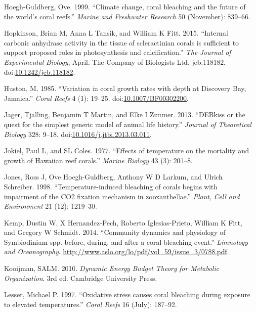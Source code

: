 \documentclass[]{elsarticle} %
\begin{document}
\hypertarget{ref-HoeghGuldberg:1999p4222}{}
Hoegh-Guldberg, Ove. 1999. ``Climate change, coral bleaching and the
future of the world's coral reefs.'' \emph{Marine and Freshwater
Research} 50 (November): 839--66.

\hypertarget{ref-Hopkinson:2015ev}{}
Hopkinson, Brian M, Anna L Tansik, and William K Fitt. 2015. ``Internal
carbonic anhydrase activity in the tissue of scleractinian corals is
sufficient to support proposed roles in photosynthesis and
calcification.'' \emph{The Journal of Experimental Biology}, April. The
Company of Biologists Ltd, jeb.118182.
doi:\href{https://doi.org/10.1242/jeb.118182}{10.1242/jeb.118182}.

\hypertarget{ref-Huston:1985ec}{}
Huston, M. 1985. ``Variation in coral growth rates with depth at
Discovery Bay, Jamaica.'' \emph{Coral Reefs} 4 (1): 19--25.
doi:\href{https://doi.org/10.1007/BF00302200}{10.1007/BF00302200}.

\hypertarget{ref-Jager:2013bj}{}
Jager, Tjalling, Benjamin T Martin, and Elke I Zimmer. 2013. ``DEBkiss
or the quest for the simplest generic model of animal life history.''
\emph{Journal of Theoretical Biology} 328: 9--18.
doi:\href{https://doi.org/10.1016/j.jtbi.2013.03.011}{10.1016/j.jtbi.2013.03.011}.

\hypertarget{ref-Jokiel:1977p7353}{}
Jokiel, Paul L, and SL Coles. 1977. ``Effects of temperature on the
mortality and growth of Hawaiian reef corals.'' \emph{Marine Biology} 43
(3): 201--8.

\hypertarget{ref-Jones:1998p3572}{}
Jones, Ross J, Ove Hoegh-Guldberg, Anthony W D Larkum, and Ulrich
Schreiber. 1998. ``Temperature-induced bleaching of corals begins with
impairment of the CO2 fixation mechanism in zooxanthellae.''
\emph{Plant, Cell and Environment} 21 (12): 1219--30.

\hypertarget{ref-Kemp:2014ug}{}
Kemp, Dustin W, X Hernandez-Pech, Roberto Iglesias-Prieto, William K
Fitt, and Gregory W Schmidt. 2014. ``Community dynamics and physiology
of Symbiodinium spp. before, during, and after a coral bleaching
event.'' \emph{Limnology and Oceanography}.
\url{http://www.aslo.org/lo/pdf/vol_59/issue_3/0788.pdf}.

\hypertarget{ref-Kooijman:2010vd}{}
Kooijman, SALM. 2010. \emph{Dynamic Energy Budget Theory for Metabolic
Organization}. 3rd ed. Cambridge University Press.

\hypertarget{ref-Lesser:1997p3587}{}
Lesser, Michael P. 1997. ``Oxidative stress causes coral bleaching
during exposure to elevated temperatures.'' \emph{Coral Reefs} 16
(July): 187--92.
\end{document}
